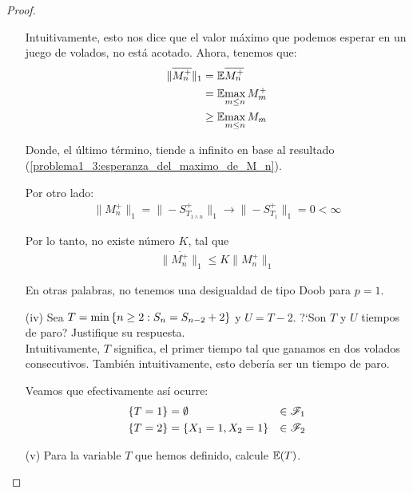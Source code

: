 \begin{proof}
\begin{enumerate}
			Intuitivamente, esto nos dice que el valor máximo que podemos esperar en un juego de volados, no está acotado.
			Ahora, tenemos que:
			\begin{align}
				\|\overline{M_{n}^{+}}\|_1  &=    \mathbb{E}{\overline{M_{n}^{+}}} \\
											&=    \mathbb{E}{\max_{m \leq n}M_m^+} \\
											&\geq \mathbb{E}{\max_{m \leq n}M_m}										
			\end{align}
				
			Donde, el último término, tiende a infinito en base al resultado 
			(\ref{problema1_3:esperanza_del_maximo_de_M_n}).

			Por otro lado:
			\begin{align}
				\|M_n^+\|_1=\|-S_{T_{1\wedge n}}^{+}\|_1  \longrightarrow  \|-S_{T_1}^+\|_1 = 0 < \infty
			\end{align}
			
			Por lo tanto, no existe número $K$, tal que
			\begin{align}
				 \|\overline{M_n^+}\|_1 \leq  K \|M_n^+\|_1
			\end{align}
			
			En otras palabras, no tenemos una desigualdad de tipo Doob para $p=1$.\\
			
		\item[(iv)]  
		Sea $T=\min\left\{ n\geq 2:S_n=S_{n-2} + 2\right\} $ y $U=T-2$. ?`Son $T$ y $U$ 
		tiempos de paro? Justifique su respuesta.\\
					
			Intuitivamente, $T$ significa, el primer tiempo tal que ganamos en dos volados consecutivos.
			También intuitivamente, esto debería ser un tiempo de paro.
			
			Veamos que efectivamente así ocurre:
			\begin{align}
				\{T = 1\} 	&= \emptyset  				& 	\in \mathscr{F}_1 \\
			   \{ T = 2 \} 	&= \{ X_1 = 1, X_2 = 1\} 	&	\in \mathscr{F}_2
			\end{align}						
			
			
			
		\item[(v)] Para la variable $T$ que hemos definido, calcule $\mathbb{E}\! \left( T \right)$.\\
		
	\end{enumerate}
\end{proof}